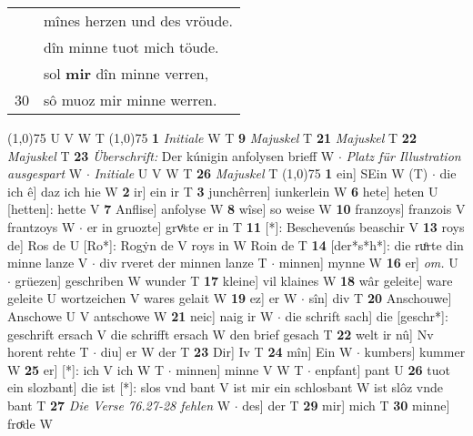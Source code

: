\documentclass[8pt,a4paper,notitlepage]{article}
\begin{document}
\begin{table}[ht]
\begin{minipage}[t]{0.5\linewidth}
\begin{tabular}{rl}
 & mînes herzen und des vröude.\\ 
 & dîn minne tuot mich töude.\\ 
 & sol \textbf{mir} dîn minne verren,\\ 
30 & sô muoz mir minne werren.\\ 
\end{tabular}
\scriptsize
\line(1,0){75} \newline
U V W T \newline
\line(1,0){75} \newline
\textbf{1} \textit{Initiale} W T  \textbf{9} \textit{Majuskel} T  \textbf{21} \textit{Majuskel} T  \textbf{22} \textit{Majuskel} T  \textbf{23} \textit{Überschrift:} Der kúnigin anfolysen brieff W   $\cdot$ \textit{Platz für Illustration ausgespart} W   $\cdot$ \textit{Initiale} U V W T  \textbf{26} \textit{Majuskel} T  \newline
\line(1,0){75} \newline
\textbf{1} ein] SEin W (T)  $\cdot$ die ich ê] daz ich hie W \textbf{2} ir] ein ir T \textbf{3} junchêrren] iunkerlein W \textbf{6} hete] heten U [hetten]: hette V \textbf{7} Anflise] anfolyse W \textbf{8} wîse] so weise W \textbf{10} franzoys] franzois V frantzoys W  $\cdot$ er in gruozte] grvͦste er in T \textbf{11} [*]: Beschevenús beaschir V \textbf{13} roys de] Ros de U [Ro*]: Rogẏn de V roys in W Roin de T \textbf{14} [der*s*h*]: die ruͦrte din minne lanze V  $\cdot$ div rveret der minnen lanze T  $\cdot$ minnen] mynne W \textbf{16} er] \textit{om.} U  $\cdot$ grüezen] geschriben W wunder T \textbf{17} kleine] vil klaines W \textbf{18} wâr geleite] ware geleite U wortzeichen V wares gelait W \textbf{19} ez] er W  $\cdot$ sîn] div T \textbf{20} Anschouwe] Anschowe U V antschowe W \textbf{21} neic] naig ir W  $\cdot$ die schrift sach] die [geschr*]: geschrift ersach V die schrifft ersach W den brief gesach T \textbf{22} welt ir nû] Nv horent rehte T  $\cdot$ diu] er W der T \textbf{23} Dir] Iv T \textbf{24} mîn] Ein W  $\cdot$ kumbers] kummer W \textbf{25} er] [*]: ich V ich W T  $\cdot$ minnen] minne V W T  $\cdot$ enpfant] pant U \textbf{26} tuot ein slozbant] die ist [*]: slos vnd bant V ist mir ein schlosbant W ist slôz vnde bant T \textbf{27} \textit{Die Verse 76.27-28 fehlen} W   $\cdot$ des] der T \textbf{29} mir] mich T \textbf{30} minne] froͤde W \newline
\end{minipage}
\end{table}
\end{document}
